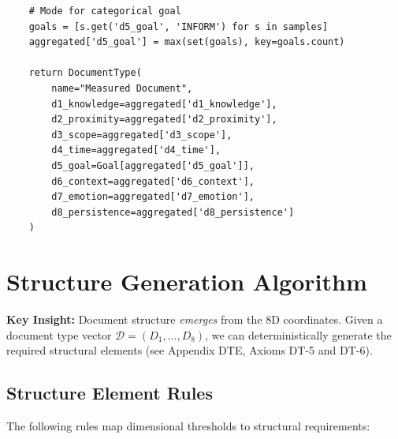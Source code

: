\begin{verbatim}
    # Mode for categorical goal
    goals = [s.get('d5_goal', 'INFORM') for s in samples]
    aggregated['d5_goal'] = max(set(goals), key=goals.count)

    return DocumentType(
        name="Measured Document",
        d1_knowledge=aggregated['d1_knowledge'],
        d2_proximity=aggregated['d2_proximity'],
        d3_scope=aggregated['d3_scope'],
        d4_time=aggregated['d4_time'],
        d5_goal=Goal[aggregated['d5_goal']],
        d6_context=aggregated['d6_context'],
        d7_emotion=aggregated['d7_emotion'],
        d8_persistence=aggregated['d8_persistence']
    )
\end{verbatim}


\section{Structure Generation Algorithm}
\label{sec:doctype-structure}

\textbf{Key Insight:} Document structure \textit{emerges} from the 8D coordinates.
Given a document type vector $\mathcal{D} = (D_1, ..., D_8)$, we can deterministically
generate the required structural elements (see Appendix DTE, Axioms DT-5 and DT-6).

\subsection{Structure Element Rules}

The following rules map dimensional thresholds to structural requirements:

